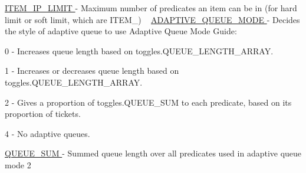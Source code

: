 \hyperlink{namespacedynamicfilterapp_1_1toggles_a755f2e9edbb8b4d5039a950757b9cfb2}{I\+T\+E\+M\+\_\+\+I\+P\+\_\+\+L\+I\+M\+IT } -\/ Maximum number of predicates an item can be in (for hard limit or soft limit, which are I\+T\+E\+M\+\_\+) ~\newline
 \hyperlink{namespacedynamicfilterapp_1_1toggles_ae5f3a5957b65dd5d074c52ef01e0f732}{A\+D\+A\+P\+T\+I\+V\+E\+\_\+\+Q\+U\+E\+U\+E\+\_\+\+M\+O\+DE } -\/ Decides the style of adaptive queue to use Adaptive Queue Mode Guide\+:
\begin{DoxyItemize}
\item 0 -\/ Increases queue length based on toggles.\+Q\+U\+E\+U\+E\+\_\+\+L\+E\+N\+G\+T\+H\+\_\+\+A\+R\+R\+AY.
\item 1 -\/ Increases or decreases queue length based on toggles.\+Q\+U\+E\+U\+E\+\_\+\+L\+E\+N\+G\+T\+H\+\_\+\+A\+R\+R\+AY.
\item 2 -\/ Gives a proportion of toggles.\+Q\+U\+E\+U\+E\+\_\+\+S\+UM to each predicate, based on its proportion of tickets.
\item 4 -\/ No adaptive queues.
\end{DoxyItemize}

\hyperlink{namespacedynamicfilterapp_1_1toggles_a472153a69096a3f18b32cd5ac247f658}{Q\+U\+E\+U\+E\+\_\+\+S\+UM } -\/ Summed queue length over all predicates used in adaptive queue mode 2


